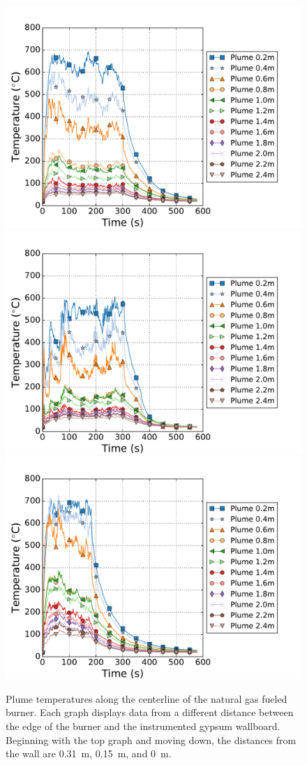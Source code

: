 \documentclass[twoside]{uocthesis}
\begin{document}
\begin{figure}[ht!]
	\centering
	\includegraphics[width=.625\columnwidth]{../Figures/IWGBNG01_TC_Plume_Avg}\\
	\includegraphics[width=.625\columnwidth]{../Figures/IWGBNG04_TC_Plume_Avg}\\
	\includegraphics[width=.625\columnwidth]{../Figures/IWGBNG05_TC_Plume_Avg}\\
	\caption[Plume temperatures for the natural gas fueled burner]{Plume temperatures along the centerline of the natural gas fueled burner.    Each graph displays data from a different distance between the edge of the burner and the instrumented gypsum wallboard.  Beginning with the top graph and moving down, the distances from the wall are 0.31~m, 0.15~m, and 0~m.}
	\label{IWGB_NG_TC_Plume_set}
\end{figure}
\end{document}
